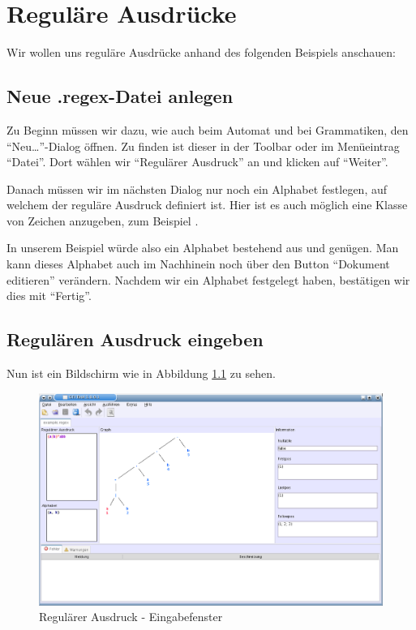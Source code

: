 \chapter{Reguläre Ausdrücke}

Wir wollen uns reguläre Ausdrücke anhand des folgenden Beispiels anschauen: 

\section{Neue .regex-Datei anlegen}

Zu Beginn müssen wir dazu, wie auch beim Automat und bei Grammatiken, den "`Neu\ldots"'-Dialog öffnen. Zu finden ist dieser in der Toolbar oder im Menüeintrag "`Datei"'. Dort wählen wir "`Regulärer Ausdruck"' an und klicken auf "`Weiter"'.\vspace{10pt}

Danach müssen wir im nächsten Dialog nur noch ein Alphabet festlegen, auf welchem der reguläre Ausdruck definiert ist. Hier ist es auch möglich eine Klasse von Zeichen anzugeben, zum Beispiel \Symbol{[a-z]}.\vspace{10pt}

In unserem Beispiel würde also ein Alphabet bestehend aus  und  genügen. Man kann dieses Alphabet auch im Nachhinein noch über den Button "`Dokument editieren"' verändern. Nachdem wir ein Alphabet festgelegt haben, bestätigen wir dies mit "`Fertig"'.\vspace{10pt}

\section{Regulären Ausdruck eingeben}

Nun ist ein Bildschirm wie in Abbildung \ref{regex} zu sehen.

\begin{figure}[h]
\begin{center}
\includegraphics[width=12cm]{../images/regex_example.png}
\caption{Regulärer Ausdruck - Eingabefenster}
\label{regex}
\end{center}
\end{figure}

